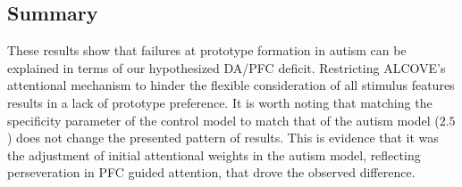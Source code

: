 
\subsection{Summary}
These results show that failures at prototype formation in autism can be explained in terms of our hypothesized DA/PFC deficit. Restricting ALCOVE's attentional mechanism to hinder the flexible consideration of all stimulus features results in a lack of prototype preference. It is worth noting that matching the specificity parameter of the control model to match that of the autism model ($2.5$) does not change the presented pattern of results. This is evidence that it was the adjustment of initial attentional weights in the autism model, reflecting perseveration in PFC guided attention, that drove the observed difference.

